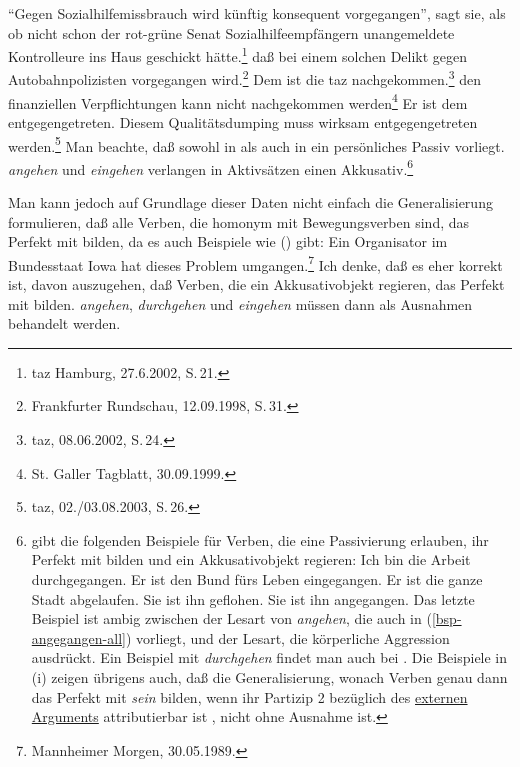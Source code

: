 \ex{}
"`Gegen Sozialhilfemissbrauch wird künftig konsequent vorgegangen"', sagt sie, als ob nicht schon der rot-grüne Senat 
     Sozialhilfeempfängern unangemeldete Kontrolleure ins Haus geschickt hätte.\footnote{
         taz Hamburg, 27.6.2002, S.\,21.%
    }%
%
\ex 
daß bei einem solchen Delikt gegen Autobahnpolizisten vorgegangen wird.\footnote{
        Frankfurter Rundschau, 12.09.1998, S.\,31.%
}
\zl
\eal
\label{ex-nachgekommen-werden}
\ex{}
Dem ist die taz nachgekommen.\footnote{
        taz, 08.06.2002, S.\,24.%
    }
\ex 
den finanziellen Verpflichtungen kann nicht nachgekommen werden\footnote{
        St. Galler Tagblatt, 30.09.1999.%
        }
\zl
\eal{}
\ex Er ist dem entgegengetreten.
\ex Diesem Qualitätsdumping muss wirksam entgegengetreten werden.\footnote{
        taz, 02./03.08.2003, S.\,26.
}
\zl
Man beachte, daß sowohl in  als auch in  ein persönliches
Passiv vorliegt. \emph{angehen} und \emph{eingehen} verlangen in Aktivsätzen einen Akkusativ.\footnote{
\citet[]{Grewendorf89a} gibt die folgenden Beispiele für Verben, die eine Passivierung erlauben,
ihr Perfekt mit \sein bilden und ein Akkusativobjekt regieren:
\eal
\ex{}
Ich bin die Arbeit durchgegangen.
\ex 
Er ist den Bund fürs Leben eingegangen.
\ex{}
Er ist die ganze Stadt abgelaufen.
\ex{}
Sie ist ihn geflohen.
\ex{}
Sie ist ihn angegangen.
\zl
Das letzte Beispiel ist ambig zwischen der Lesart von \emph{angehen},
die auch in (\ref{bsp-angegangen-all}) vorliegt, und der Lesart, die
körperliche Aggression ausdrückt.
Ein Beispiel mit \emph{durchgehen} findet man auch bei \citet[]{Toman86a}.
Die Beispiele in (i) zeigen übrigens auch, daß die Generalisierung, wonach
Verben genau dann das Perfekt mit \emph{sein} bilden, wenn ihr Partizip 2 bezüglich des 
\hyperlink{externesArgument}{externen Arguments} %
attributierbar ist \citep[]{Gunkel2003b}, nicht ohne Ausnahme ist.%
}

Man kann jedoch auf Grundlage dieser Daten nicht einfach die Generalisierung formulieren,
daß alle Verben, die homonym mit Bewegungsverben sind, das Perfekt mit
\sein bilden, da es auch Beispiele wie () gibt:
\ea
Ein Organisator im Bundesstaat Iowa hat dieses Problem umgangen.\footnote{
 Mannheimer Morgen, 30.05.1989.%
}
\z
Ich denke, daß es eher korrekt ist, davon auszugehen, daß Verben, die
ein Akkusativobjekt regieren, das Perfekt mit \haben bilden. 
\emph{angehen}, \emph{durchgehen} und \emph{eingehen} müssen dann als
Ausnahmen behandelt werden.%
%

